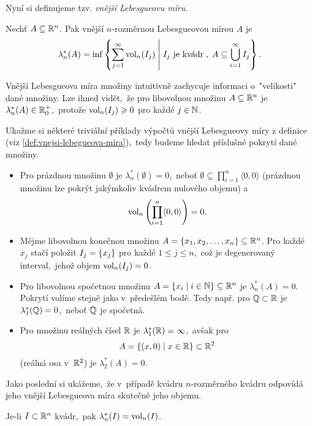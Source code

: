Nyní si definujeme tzv. \emph{vnější Lebesgueovu míru}.
\begin{definition}\label{def:vnejsi-lebegueova-mira}
    Nechť $A\subseteq\mathbb{R}^n$. Pak vnější $n$-rozměr\-nou Lebesgueovou mírou $A$ je
    \[\lambda_n^*(A)=\inf\left\{\sum_{j=1}^{\infty}\operatorname{vol}_n(I_j)\;\middle|\;\text{$I_j$ je kvádr}\;,\;A\subseteq\bigcup_{i=1}^\infty I_j\right\}.\]
\end{definition}
Vnější Lebesgueova míra množiny intuitivně zachycuje informaci o~"velikosti" dané množiny.  Lze ihned vidět,~že pro libovolnou množinu $A\subseteq\mathbb{R}^n$ je $\lambda_n^*(A)\in\mathbb{R}_0^+$,~protože $\operatorname{vol}_n(I_j)\geqslant0$ pro každé $j\in\mathbb{N}$.
\begin{example}\label{ex:lebegueova-mira-trivialni-priklady}
    Ukažme si některé triviální příklady výpočtů vnější Lebesgueovy míry z definice (viz \ref{def:vnejsi-lebegueova-mira}),~tedy budeme hledat příslušné pokrytí dané množiny.
    \begin{itemize}
        \item Pro prázdnou množinu $\emptyset$ je $\lambda_n^*(\emptyset)=0$,~neboť $\emptyset\subseteq\prod_{i=1}^{n}\langle0,0\rangle$ (prázdnou množinu lze pokrýt jakýmkoliv kvádrem nulového objemu) a
        \[\operatorname{vol}_n\left(\prod_{i=1}^{n}\langle0,0\rangle\right)=0.\]
        \item Mějme libovolnou konečnou množinu $A=\left\{x_1,x_2,\dots,x_n\right\}\subseteq\mathbb{R}^n$. Pro každé $x_j$ stačí položit $I_j=\left\{x_j\right\}$ pro každé $1\leqslant j\leqslant n$,~což je degenerovaný interval,~jehož objem $\operatorname{vol}_n(I_j)=0$.
        \item Pro libovolnou spočetnou množinu $A=\left\{x_i\mid i\in\mathbb{N}\right\}\subseteq\mathbb{R}^n$ je $\lambda_n^*(A)=0$. Pokrytí volíme stejně jako v~předešlém bodě. Tedy např. pro $\mathbb{Q}\subset\mathbb{R}$ je $\lambda_1^*(\mathbb{Q})=0$,~neboť $\mathbb{Q}$ je spočetná.
        \item Pro množinu reálných čísel $\mathbb{R}$ je $\lambda_1^*(\mathbb{R})=\infty$,~avšak pro 
        \[A=\left\{(x,0)\mid x\in\mathbb{R}\right\}\subset\mathbb{R}^2\]
        (reálná osa v~$\mathbb{R}^2$) je $\lambda_2^*(A)=0$.
    \end{itemize}
\end{example}
Jako poslední si ukážeme,~že v~případě kvádru $n$-rozměrného kvádru odpovídá jeho vnější Lebesgueova míra skutečně jeho objemu.
\begin{proposition}\label{prop:lebegueova-mira-objem-kvadru}
    Je-li $I\subset\mathbb{R}^n$ kvádr,~pak $\lambda_n^*(I)=\operatorname{vol}_n(I)$.
\end{proposition}
